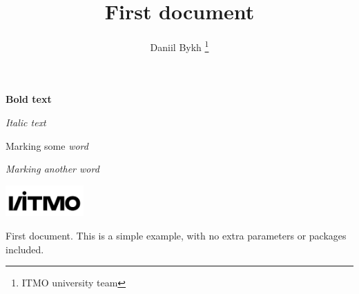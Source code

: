 \documentclass[12pt, a4paper]{article}
\title{First document}
\author{
    Daniil Bykh
    \thanks{ITMO university team}    
    }
\begin{document}
    \maketitle
    \textbf{Bold text}

    \textit{Italic text}

    Marking some \emph{word}

    \textit{Marking another \emph{word}}

    \includegraphics[width=3cm]{assets/itmo_logo}
    

First document. This is a simple example, with no 
extra parameters or packages included.
\end{document}
